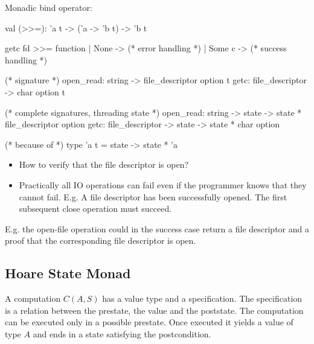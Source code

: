 \noindent Monadic bind operator:
\begin{ocaml}
  val (>>=): 'a t -> ('a -> 'b t) -> 'b t
\end{ocaml}


\begin{ocaml}
  getc fd >>= function
  | None ->
    (* error handling *)
  | Some c ->
    (* success handling *)

  (* signature *)
  open_read: string -> file_descriptor option t
  getc: file_descriptor -> char option t

  (* complete signatures, threading state *)
  open_read: string -> state -> state * file_descriptor option
  getc: file_descriptor -> state -> state * char option

  (* because of *)
  type 'a t = state -> state * 'a
\end{ocaml}
%

\begin{itemize}
\item How to verify that the file descriptor is open?


\item Practically all IO operations can fail even if the programmer knows that
  they cannot fail. E.g. A file descriptor has been successfully opened. The
  first subsequent close operation must succeed.

\end{itemize}


E.g. the open-file operation could in the success case return a file
descriptor and a proof that the corresponding file descriptor is open.


\subsection{Hoare State Monad}

A computation $C(A,S)$ has a value type and a specification. The specification
is a relation between the prestate, the value and the poststate. The
computation can be executed only in a possible prestate. Once executed it
yields a value of type $A$ and ends in a state satisfying the postcondition.

